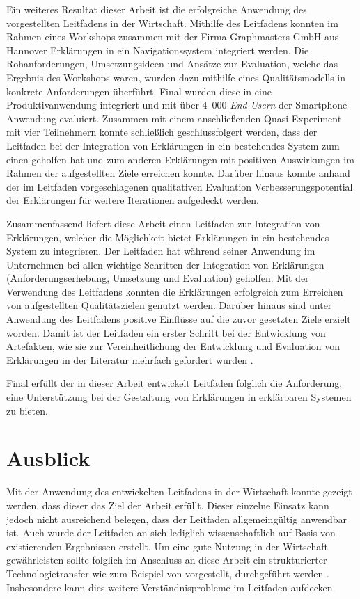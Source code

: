Ein weiteres Resultat dieser Arbeit ist die erfolgreiche Anwendung des vorgestellten Leitfadens in der Wirtschaft. Mithilfe des Leitfadens konnten im Rahmen eines Workshops zusammen mit der Firma Graphmasters GmbH aus Hannover Erklärungen in ein Navigationssystem integriert werden. Die Rohanforderungen, Umsetzungsideen und Ansätze zur Evaluation, welche das Ergebnis des Workshops waren, wurden dazu mithilfe eines Qualitätsmodells in konkrete Anforderungen überführt. Final wurden diese in eine Produktivanwendung integriert und mit über 4~000 \textit{End Usern} der Smartphone-Anwendung evaluiert. Zusammen mit einem anschließenden Quasi-Experiment mit vier Teilnehmern konnte schließlich geschlussfolgert werden, dass der Leitfaden bei der Integration von Erklärungen in ein bestehendes System zum einen geholfen hat und zum anderen Erklärungen mit positiven Auswirkungen im Rahmen der aufgestellten Ziele erreichen konnte. Darüber hinaus konnte anhand der im Leitfaden vorgeschlagenen qualitativen Evaluation Verbesserungspotential der Erklärungen für weitere Iterationen aufgedeckt werden.

\newpage

Zusammenfassend liefert diese Arbeit einen Leitfaden zur Integration von Erklärungen, welcher die Möglichkeit bietet Erklärungen in ein bestehendes System zu integrieren. Der Leitfaden hat während seiner Anwendung im Unternehmen bei allen wichtige Schritten der Integration von Erklärungen (Anforderungserhebung, Umsetzung und Evaluation) geholfen. Mit der Verwendung des Leitfadens konnten die Erklärungen erfolgreich zum Erreichen von aufgestellten Qualitätszielen genutzt werden. Darüber hinaus sind unter Anwendung des Leitfadens positive Einflüsse auf die zuvor gesetzten Ziele erzielt worden. Damit ist der Leitfaden ein erster Schritt bei der Entwicklung von Artefakten, wie sie zur Vereinheitlichung der Entwicklung und Evaluation von Erklärungen in der Literatur mehrfach gefordert wurden \cite{kohl_explainability_2019,lim_2009_assessing,sokol_explainability_2020}.

Final erfüllt der in dieser Arbeit entwickelt Leitfaden folglich die Anforderung, eine Unterstützung bei der Gestaltung von Erklärungen in erklärbaren Systemen zu bieten.

\section{Ausblick}

Mit der Anwendung des entwickelten Leitfadens in der Wirtschaft konnte gezeigt werden, dass dieser das Ziel der Arbeit erfüllt. Dieser einzelne Einsatz kann jedoch nicht ausreichend belegen, dass der Leitfaden allgemeingültig anwendbar ist. Auch wurde der Leitfaden an sich lediglich wissenschaftlich auf Basis von existierenden Ergebnissen erstellt. Um eine gute Nutzung in der Wirtschaft gewährleisten sollte folglich im Anschluss an diese Arbeit ein strukturierter Technologietransfer wie zum Beispiel von \citeauthor{4012630} vorgestellt, durchgeführt werden \cite{4012630}. Insbesondere kann dies weitere Verständnisprobleme im Leitfaden aufdecken.


